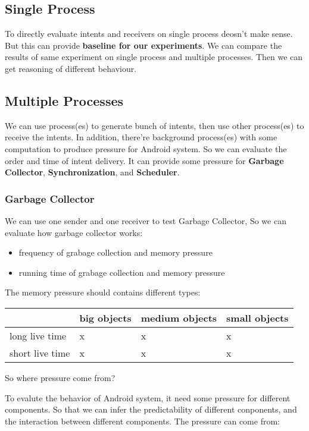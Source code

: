\documentclass[11pt]{article}
\begin{document}
\subsection{Single Process}
\label{sec-3-1}
To directly evaluate intents and receivers on
single process deosn't make sense.
But this can provide \textbf{baseline for our experiments}.
We can compare the results of same experiment on single process
and multiple processes.
Then we can get reasoning of different behaviour.

\subsection{Multiple Processes}
\label{sec-3-2}
We can use process(es) to generate bunch of intents, then use other
process(es) to receive the intents.
In addition, there're background process(es) with some computation
to produce pressure for Android system.
So we can evaluate the order and time of intent delivery.
It can provide some pressure for \textbf{Garbage Collector}, \textbf{Synchronization}, and \textbf{Scheduler}.

\subsubsection{Garbage Collector}
\label{sec-3-2-1}
We can use one sender and one receiver to test Garbage Collector,
So we can evaluate how garbage collector works:
\begin{itemize}
\item frequency of grabage collection and memory pressure
\item running time of grabage collection and memory pressure
\end{itemize}

The memory pressure should contains different types\label{Memory-Pressure-Types}:
\begin{center}
\begin{tabular}{l|lll}
 & big objects & medium objects & small objects\\
\hline
long live time & x & x & x\\
short live time & x & x & x\\
\end{tabular}
\end{center}

So where pressure come from?

To evalute the behavior of Android system, it need some pressure for
different components. So that we can infer the predictability of different
conponents, and the interaction between different components.
The pressure can come from:
\end{document}
